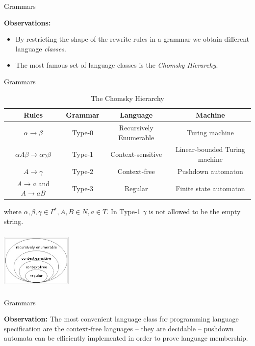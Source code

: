 \documentclass{beamer}
\begin{document}
\begin{frame}[fragile]{Grammars}

{\bf Observations:}
\begin{itemize}
\item By restricting the shape of the rewrite rules in a grammar we obtain different language {\em classes}.
\item  The most famous set of language classes is the {\em Chomsky Hierarchy}.
\end{itemize}
\end{frame}

\begin{frame}[fragile]{Grammars}

\scriptsize

\begin{table}[htdp]
\caption{The Chomsky Hierarchy}
\begin{center}
{\tiny
\begin{tabular}{|c|c|c|c|}
Rules & Grammar & Language & Machine \\ \hline
$\alpha \rightarrow \beta$ & Type-0 & Recursively Enumerable & Turing machine \\
$\alpha A \beta \rightarrow \alpha\gamma\beta$  & Type-1 & Context-sensitive & Linear-bounded Turing machine\\
$A  \rightarrow \gamma$  & Type-2 & Context-free & Pushdown automaton\\
$A \rightarrow a$ and $A \rightarrow a B$ & Type-3 & Regular & Finite state automaton
\end{tabular}
}
\end{center}
\label{default}
\end{table}%
where $\alpha,\beta,\gamma\in \Gamma^*, A,B \in N, a\in T$.
In Type-1 $\gamma$ is not allowed to be the empty string.

\begin{center}
    \includegraphics[height=30mm,width=35mm]{images/chomsky-hierarchy}
\end{center}


\end{frame}

\begin{frame}[fragile]{Grammars}

{\bf Observation:} The most convenient language class for programming language specification are the context-free
languages -- they are decidable -- pushdown automata can be efficiently implemented in order to prove language membership.
\end{frame}
\end{document}
